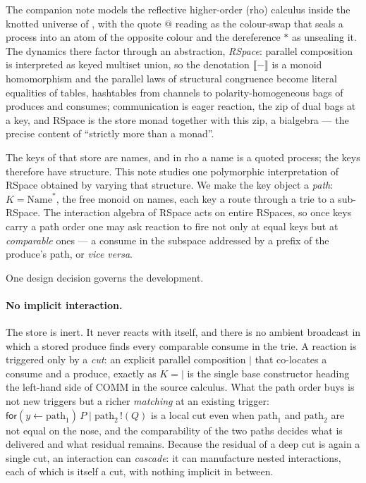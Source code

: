 \documentclass[11pt]{article}
\makeatletter
\theoremstyle{plain}
\theoremstyle{definition}
\newcommand{\den}[1]{\llbracket #1 \rrbracket}
\newcommand{\Name}{\mathrm{Name}}
\newcommand{\rfor}[2]{\mathsf{for}(#1\!\leftarrow\!#2)\,}
\newcommand{\rout}[2]{#1\,!(#2)}
\newcommand{\quo}{@}
\newcommand{\der}{{\ast}}
\makeatother
\begin{document}
The companion note \cite{KnotRho} models the reflective higher-order (rho) calculus
\cite{MR05} inside the knotted universe of \cite{Knot}, with the quote $\quo$ reading as the
colour-swap that seals a process into an atom of the opposite colour and the dereference $\der$ as
unsealing it. The dynamics there factor through an abstraction, \emph{RSpace}: parallel composition
is interpreted as keyed multiset union, so the denotation $\den{-}$ is a monoid homomorphism and the
parallel laws of structural congruence become literal equalities of tables, hashtables from channels
to polarity-homogeneous bags of produces and consumes; communication is eager reaction, the zip of
dual bags at a key, and RSpace is the store monad together with this zip, a bialgebra --- the precise
content of ``strictly more than a monad''.

The keys of that store are names, and in rho a name is a quoted process; the keys therefore have
structure. This note studies one polymorphic interpretation of RSpace obtained by varying that
structure. We make the key object a \emph{path}: $K=\Name^{\ast}$, the free monoid on names, each key
a route through a trie to a sub-RSpace. The interaction algebra of RSpace acts on entire RSpaces, so
once keys carry a path order one may ask reaction to fire not only at equal keys but at
\emph{comparable} ones --- a consume in the subspace addressed by a prefix of the produce's path, or
\emph{vice versa}.

One design decision governs the development.

\paragraph{No implicit interaction.}
The store is inert. It never reacts with itself, and there is no ambient broadcast in which a stored
produce finds every comparable consume in the trie. A reaction is triggered only by a \emph{cut}: an
explicit parallel composition $\mid$ that co-locates a consume and a produce, exactly as $K=\mid$ is
the single base constructor heading the left-hand side of COMM in the source calculus. What the path
order buys is not new triggers but a richer \emph{matching} at an existing trigger:
$\rfor{y}{\mathrm{path}_1}P \mid \rout{\mathrm{path}_2}{Q}$ is a local cut even when
$\mathrm{path}_1$ and $\mathrm{path}_2$ are not equal on the nose, and the comparability of the two
paths decides what is delivered and what residual remains. Because the residual of a deep cut is
again a single cut, an interaction can \emph{cascade}: it can manufacture nested interactions, each
of which is itself a cut, with nothing implicit in between.
\end{document}

